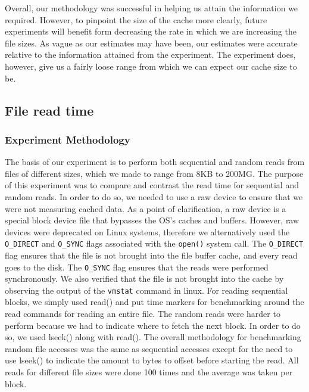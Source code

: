 \documentclass{article} %
\begin{document}
Overall, our methodology was successful in helping us attain the information we required. However, to pinpoint the size of the cache more clearly, future experiments will benefit form decreasing the rate in which we are increasing the file sizes. As vague as our estimates may have been, our estimates were accurate relative to the information attained from the experiment. The experiment does, however, give us a fairly loose range from which we can expect our cache size to be.

\subsection{File read time}

\subsubsection{Experiment Methodology}
The basis of our experiment is to perform both sequential and random reads from files of different sizes, which we made to range from 8KB to 200MG. The purpose of this experiment was to compare and contrast the read time for sequential and random reads. In order to do so, we needed to use a raw device to ensure that we were not measuring cached data. As a point of clarification, a raw device is a special block device file that bypasses the OS's caches and buffers. However, raw devices were deprecated on Linux systems, therefore we alternatively used the \texttt{O\_DIRECT} and \texttt{O\_SYNC} flags associated with the \texttt{open()} system call. The \texttt{O\_DIRECT} flag ensures that the file is not brought into the file buffer cache, and every read goes to the disk. The \texttt{O\_SYNC} flag ensures that the reads were performed synchronously. 
We also verified that the file is not brought into the cache by observing the output of the \texttt{vmstat} command in linux. For reading sequential blocks, we simply used read() and put time markers for benchmarking around the read commands for reading an entire file. The random reads were harder to perform because we had to indicate where to fetch the next block. In order to do so, we used lseek() along with read(). The overall methodology for benchmarking random file accesses was the same as sequential accesses except for the need to use lseek() to indicate the amount to bytes to offset before starting the read. All reads for different file sizes were done 100 times and the average was taken per block.
\end{document}
